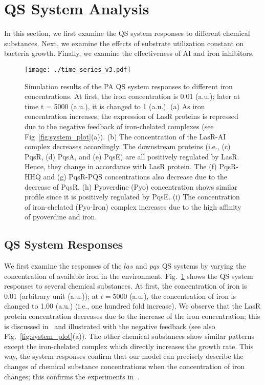 \documentclass[runningheads]{llncs}
\begin{document}
\section{QS System Analysis}\label{analysis}
In this section, we first examine the QS system responses to different chemical substances. Next, we examine the effects of substrate utilization constant on bacteria growth. Finally, we examine the effectiveness of AI and iron inhibitors. 
\vspace{-20pt}
\begin{figure}[t]
\centering
\texttt{[image: ./time\_series\_v3.pdf]}
\caption{Simulation results of the PA QS system responses to different iron concentrations. At first, the iron concentration is 0.01 (a.u.);  later at time t = 5000 (a.u.), it is changed to 1 (a.u.). (a) As iron concentration increases, the expression of LasR proteins is repressed due to the negative feedback of iron-chelated complexes (see Fig~\ref{fig:system_plot}(a)).  (b) The concentration of the LasR-AI complex decreases accordingly. The downstream proteins (i.e., (c) PqsR, (d) PqsA, and (e) PqsE) are all positively regulated by LasR. Hence, they change in accordance with LasR protein. The (f) PqsR-HHQ and (g) PqsR-PQS concentrations also decrease due to the decrease of PqsR. (h) Pyoverdine (Pyo) concentration shows similar profile since it is positively regulated by PqsE.  (i) The concentration of iron-chelated (Pyo-Iron) complex increases due to the high affinity of pyoverdine and iron. }
\label{fig:time_series}
\end{figure}
\subsection{QS System Responses}
We first examine the responses of the $las$ and $pqs$ QS systems by varying the concentration of available iron in the environment. Fig.~\ref{fig:time_series} shows the QS system responses to several chemical substances. At first, the concentration of iron is 0.01 (arbitrary unit (a.u.)); at $t = 5000$ (a.u.), the concentration of iron is changed to 1.00 (a.u.) (i.e., one hundred fold increase). We observe that the LasR protein concentration decreases due to the increase of the iron concentration; this is discussed in~\cite{Kim2005} and illustrated with the negative feedback (see also Fig.~\ref{fig:system_plot}(a)). The other chemical substances show similar patterns except the iron-chelated complex which directly increases the growth rate. This way, the system responses confirm that our model can precisely describe the changes of chemical substance concentrations when the concentration of iron changes; this confirms the experiments in~\cite{Kim2005}. 
\end{document}
